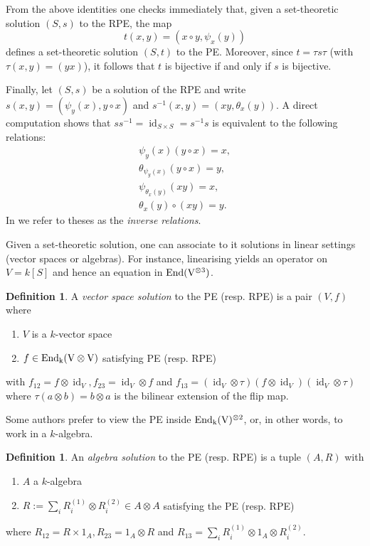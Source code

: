 \documentclass[a4paper,10pt]{amsart}
\theoremstyle{definition}
\newtheorem{definition}[lemma]{Definition}
\theoremstyle{remark}
\newcommand\End{\rm End}
\DeclareMathOperator{\id}{id}
\newcommand\ot{\otimes}
\begin{document}
From the above identities one checks immediately that, given a set-theoretic solution $(S,s)$ to the RPE, the map
$$t(x,y) = (x\circ y, \psi_x(y))$$
defines a set-theoretic solution $(S,t)$ to the PE. 
Moreover, since $t = \tau s \tau$ (with $\tau(x,y)=(yx)$), it follows that $t$ is bijective if and only if $s$ is bijective. 

Finally, let $(S,s)$ be a solution of the RPE and write $s(x,y)=(\psi_y(x),y\circ x)$ and $s^{-1}(x,y) = (xy, \theta_x(y))$. A direct computation shows that $ss^{-1}=\id_{S\times S}= s^{-1}s$  is equivalent to the following relations:
\begin{align}
    \psi_y(x)(y\circ x) = x,\\
    \theta_{\psi_y(x)}(y\circ x) = y,\\
    \psi_{\theta_x(y)}(xy) = x, \label{eq:psitheta}\\ 
    \theta_{x}(y) \circ (xy)= y.
\end{align}
In  we refer to theses as the \emph{inverse relations}.\medskip

Given a set-theoretic solution, one can associate to it solutions in linear settings (vector spaces or algebras). For instance, linearising yields an operator on $V=k[S]$ and hence an equation in $\End(V^{\otimes 3})$. 

\begin{definition}\label{def VS PE}
A \emph{vector space solution} to the PE (resp. RPE) is a pair $(V,f)$ where 
\begin{enumerate}
    \item $V$ is a $k$-vector space
    \item $f \in \End_k(V\otimes V)$ satisfying PE (resp. RPE)
\end{enumerate} 
with $f_{12} = f \otimes \id_V, f_{23}= \id_V \otimes f$ and $f_{13} = (\id_V \otimes \tau)(f \otimes \id_V)(\id_V \otimes \tau)$
where $\tau(a\otimes b) = b\otimes a $ is the bilinear extension of the flip map.
\end{definition}

Some authors prefer to view the PE inside $\End_k(V)^{\ot 2}$, or, in other words, to work in a $k$-algebra. 

\begin{definition}\label{def algebra PE}
An \emph{algebra solution} to the PE (resp. RPE) is a tuple $(A,R)$ with 
\begin{enumerate}
    \item $A$ a $k$-algebra
    \item $R := \sum_i R_i^{(1)} \otimes R_i^{(2)} \in A \otimes A$ satisfying the PE (resp. RPE)
\end{enumerate}
where $R_{12}= R \times 1_A, R_{23} = 1_A \otimes R$ and $R_{13} = \sum_i R_i^{(1)}\otimes 1_A \otimes R_i^{(2)}.$
\end{definition}
\end{document}

